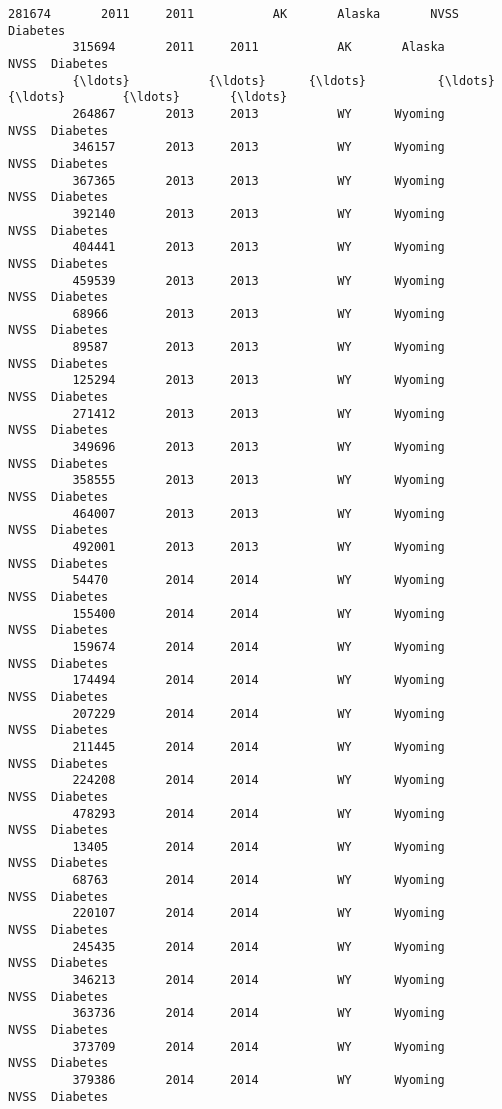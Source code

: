 \documentclass[11pt]{article}
\begin{document}
\begin{Verbatim}[commandchars=\\\{\}]
         281674       2011     2011           AK       Alaska       NVSS  Diabetes   
         315694       2011     2011           AK       Alaska       NVSS  Diabetes   
         {\ldots}           {\ldots}      {\ldots}          {\ldots}          {\ldots}        {\ldots}       {\ldots}   
         264867       2013     2013           WY      Wyoming       NVSS  Diabetes   
         346157       2013     2013           WY      Wyoming       NVSS  Diabetes   
         367365       2013     2013           WY      Wyoming       NVSS  Diabetes   
         392140       2013     2013           WY      Wyoming       NVSS  Diabetes   
         404441       2013     2013           WY      Wyoming       NVSS  Diabetes   
         459539       2013     2013           WY      Wyoming       NVSS  Diabetes   
         68966        2013     2013           WY      Wyoming       NVSS  Diabetes   
         89587        2013     2013           WY      Wyoming       NVSS  Diabetes   
         125294       2013     2013           WY      Wyoming       NVSS  Diabetes   
         271412       2013     2013           WY      Wyoming       NVSS  Diabetes   
         349696       2013     2013           WY      Wyoming       NVSS  Diabetes   
         358555       2013     2013           WY      Wyoming       NVSS  Diabetes   
         464007       2013     2013           WY      Wyoming       NVSS  Diabetes   
         492001       2013     2013           WY      Wyoming       NVSS  Diabetes   
         54470        2014     2014           WY      Wyoming       NVSS  Diabetes   
         155400       2014     2014           WY      Wyoming       NVSS  Diabetes   
         159674       2014     2014           WY      Wyoming       NVSS  Diabetes   
         174494       2014     2014           WY      Wyoming       NVSS  Diabetes   
         207229       2014     2014           WY      Wyoming       NVSS  Diabetes   
         211445       2014     2014           WY      Wyoming       NVSS  Diabetes   
         224208       2014     2014           WY      Wyoming       NVSS  Diabetes   
         478293       2014     2014           WY      Wyoming       NVSS  Diabetes   
         13405        2014     2014           WY      Wyoming       NVSS  Diabetes   
         68763        2014     2014           WY      Wyoming       NVSS  Diabetes   
         220107       2014     2014           WY      Wyoming       NVSS  Diabetes   
         245435       2014     2014           WY      Wyoming       NVSS  Diabetes   
         346213       2014     2014           WY      Wyoming       NVSS  Diabetes   
         363736       2014     2014           WY      Wyoming       NVSS  Diabetes   
         373709       2014     2014           WY      Wyoming       NVSS  Diabetes   
         379386       2014     2014           WY      Wyoming       NVSS  Diabetes   
         

\end{Verbatim}
\end{document}
